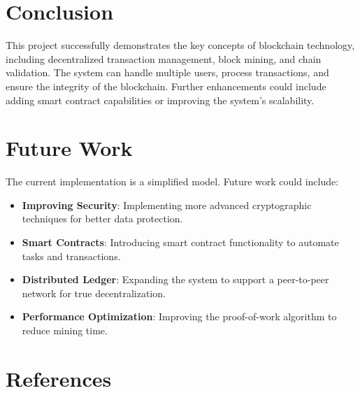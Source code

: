 \documentclass[sigconf]{acmart}
\begin{document}
\section{Conclusion}

This project successfully demonstrates the key concepts of blockchain technology, including decentralized transaction management, block mining, and chain validation. The system can handle multiple users, process transactions, and ensure the integrity of the blockchain. Further enhancements could include adding smart contract capabilities or improving the system’s scalability.

\section{Future Work}

The current implementation is a simplified model. Future work could include:
\begin{itemize}
    \item \textbf{Improving Security}: Implementing more advanced cryptographic techniques for better data protection.
    \item \textbf{Smart Contracts}: Introducing smart contract functionality to automate tasks and transactions.
    \item \textbf{Distributed Ledger}: Expanding the system to support a peer-to-peer network for true decentralization.
    \item \textbf{Performance Optimization}: Improving the proof-of-work algorithm to reduce mining time.
\end{itemize}

\section{References}


\end{document}
